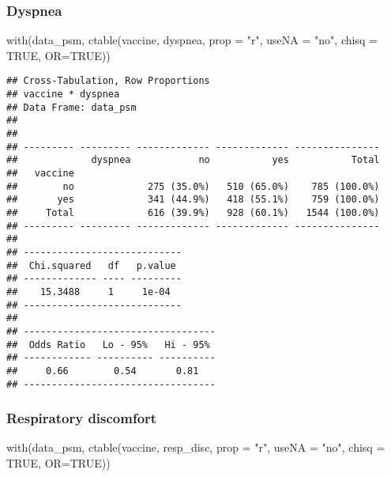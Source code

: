 \documentclass[
]{article}
\newenvironment{Shaded}{\begin{snugshade}}{\end{snugshade}}
\newcommand{\AttributeTok}[1]{\textcolor[rgb]{0.77,0.63,0.00}{#1}}
\newcommand{\ConstantTok}[1]{\textcolor[rgb]{0.00,0.00,0.00}{#1}}
\newcommand{\FunctionTok}[1]{\textcolor[rgb]{0.00,0.00,0.00}{#1}}
\newcommand{\NormalTok}[1]{#1}
\newcommand{\StringTok}[1]{\textcolor[rgb]{0.31,0.60,0.02}{#1}}
\begin{document}
\hypertarget{dyspnea-1}{%
\subsubsection{Dyspnea}\label{dyspnea-1}}

\begin{Shaded}
\begin{Highlighting}[]
\FunctionTok{with}\NormalTok{(data\_psm, }\FunctionTok{ctable}\NormalTok{(vaccine, dyspnea, }\AttributeTok{prop =} \StringTok{"r"}\NormalTok{, }\AttributeTok{useNA =} \StringTok{"no"}\NormalTok{, }\AttributeTok{chisq =} \ConstantTok{TRUE}\NormalTok{, }\AttributeTok{OR=}\ConstantTok{TRUE}\NormalTok{))}
\end{Highlighting}
\end{Shaded}

\begin{verbatim}
## Cross-Tabulation, Row Proportions  
## vaccine * dyspnea  
## Data Frame: data_psm  
## 
## 
## --------- --------- ------------- ------------- ---------------
##             dyspnea            no           yes           Total
##   vaccine                                                      
##        no             275 (35.0%)   510 (65.0%)    785 (100.0%)
##       yes             341 (44.9%)   418 (55.1%)    759 (100.0%)
##     Total             616 (39.9%)   928 (60.1%)   1544 (100.0%)
## --------- --------- ------------- ------------- ---------------
## 
## ----------------------------
##  Chi.squared   df   p.value 
## ------------- ---- ---------
##    15.3488     1     1e-04  
## ----------------------------
## 
## ----------------------------------
##  Odds Ratio   Lo - 95%   Hi - 95% 
## ------------ ---------- ----------
##     0.66        0.54       0.81   
## ----------------------------------
\end{verbatim}

\hypertarget{respiratory-discomfort-1}{%
\subsubsection{Respiratory discomfort}\label{respiratory-discomfort-1}}

\begin{Shaded}
\begin{Highlighting}[]
\FunctionTok{with}\NormalTok{(data\_psm, }\FunctionTok{ctable}\NormalTok{(vaccine, resp\_disc, }\AttributeTok{prop =} \StringTok{"r"}\NormalTok{, }\AttributeTok{useNA =} \StringTok{"no"}\NormalTok{, }\AttributeTok{chisq =} \ConstantTok{TRUE}\NormalTok{, }\AttributeTok{OR=}\ConstantTok{TRUE}\NormalTok{))}
\end{Highlighting}
\end{Shaded}
\end{document}
